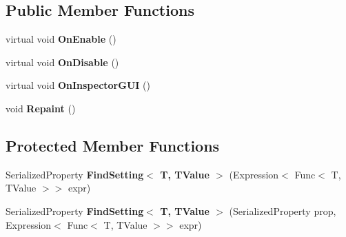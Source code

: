 \subsection*{Public Member Functions}
\begin{DoxyCompactItemize}
\item 
\mbox{\label{class_unity_editor_1_1_post_processing_1_1_post_processing_model_editor_afc8898be3e15186a93a79ec38739988c}} 
virtual void {\bfseries On\+Enable} ()
\item 
\mbox{\label{class_unity_editor_1_1_post_processing_1_1_post_processing_model_editor_a65506dbbea144f02d2c0f90fa016a4f8}} 
virtual void {\bfseries On\+Disable} ()
\item 
\mbox{\label{class_unity_editor_1_1_post_processing_1_1_post_processing_model_editor_a925d6beb73dfef3d52311a08027d5850}} 
virtual void {\bfseries On\+Inspector\+G\+UI} ()
\item 
\mbox{\label{class_unity_editor_1_1_post_processing_1_1_post_processing_model_editor_a3309ef89e31c184e80444ddf0bef8b86}} 
void {\bfseries Repaint} ()
\end{DoxyCompactItemize}
\subsection*{Protected Member Functions}
\begin{DoxyCompactItemize}
\item 
\mbox{\label{class_unity_editor_1_1_post_processing_1_1_post_processing_model_editor_a7281fe55fc7ff7f54608cf7a8b9162f2}} 
Serialized\+Property {\bfseries Find\+Setting$<$ T, T\+Value $>$} (Expression$<$ Func$<$ T, T\+Value $>$$>$ expr)
\item 
\mbox{\label{class_unity_editor_1_1_post_processing_1_1_post_processing_model_editor_a381e2adb0ae7f6320a3bcab6f4b68249}} 
Serialized\+Property {\bfseries Find\+Setting$<$ T, T\+Value $>$} (Serialized\+Property prop, Expression$<$ Func$<$ T, T\+Value $>$$>$ expr)
\end{DoxyCompactItemize}
